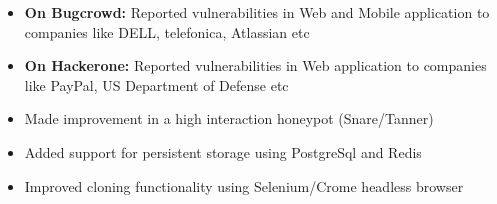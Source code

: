 \documentclass[10pt,a4paper,ragged2e]{altacv}
\begin{document}

  \begin{fullwidth}
  \makecvheader
  \end{fullwidth}


  \begin{itemize}
  \item \textbf{\color{black}On Bugcrowd: } Reported vulnerabilities in Web and Mobile application to companies like DELL, telefonica, Atlassian etc

  \item \textbf{\color{black}On Hackerone: } Reported vulnerabilities in Web application to companies like PayPal, US Department of Defense etc
  
  \end{itemize}

  \divider

  \begin{itemize}
  \item Made improvement in a high interaction honeypot (Snare/Tanner)

  \item Added support for persistent storage using PostgreSql and Redis

  \item Improved cloning functionality using Selenium/Crome headless browser

  \end{itemize}
\end{document}
